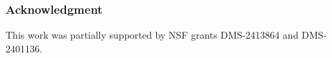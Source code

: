 \documentclass[11pt]{article}
\theoremstyle{definition}
\theoremstyle{remark}
\numberwithin{theorem}{section}
\begin{document}
            
    \subsubsection*{Acknowledgment}
    This work was partially supported by NSF grants DMS-2413864 and DMS-2401136.
    
    \medskip
    \medskip

    
    

    
    
\end{document}
